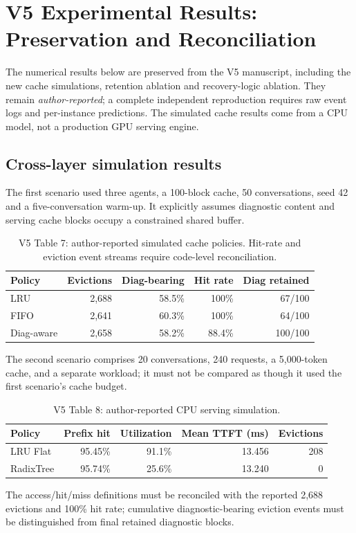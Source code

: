 \section{V5 Experimental Results: Preservation and Reconciliation}
\label{sec:v5_exp_preserve}
The numerical results below are preserved from the V5 manuscript, including
the new cache simulations, retention ablation and recovery-logic ablation.
They remain \emph{author-reported}; a complete independent reproduction
requires raw event logs and per-instance predictions. The simulated cache
results come from a CPU model, not a production GPU serving engine.

\subsection{Cross-layer simulation results}
The first scenario used three agents, a 100-block cache, 50 conversations,
seed 42 and a five-conversation warm-up. It explicitly assumes diagnostic
content and serving cache blocks occupy a constrained shared buffer.
\begin{table}[ht]\centering\footnotesize
\caption{V5 Table 7: author-reported simulated cache policies. Hit-rate
and eviction event streams require code-level reconciliation.}
\label{tab:v5sim1}
\begin{tabular}{lrrrr}\toprule
Policy & Evictions & Diag-bearing & Hit rate & Diag retained\\\midrule
LRU & 2,688 & 58.5\% & 100\% & 67/100\\
FIFO & 2,641 & 60.3\% & 100\% & 64/100\\
Diag-aware & 2,658 & 58.2\% & 88.4\% & 100/100\\
\bottomrule\end{tabular}\end{table}
The second scenario comprises 20 conversations, 240 requests, a
5,000-token cache, and a separate workload; it must not be compared as
though it used the first scenario's cache budget.
\begin{table}[ht]\centering\footnotesize
\caption{V5 Table 8: author-reported CPU serving simulation.}
\label{tab:v5sim2}
\begin{tabular}{lrrrr}\toprule
Policy & Prefix hit & Utilization & Mean TTFT (ms) & Evictions\\\midrule
LRU Flat & 95.45\% & 91.1\% & 13.456 & 208\\
RadixTree & 95.74\% & 25.6\% & 13.240 & 0\\
\bottomrule\end{tabular}\end{table}
The access/hit/miss definitions must be reconciled with the reported 2,688
evictions and 100\% hit rate; cumulative diagnostic-bearing eviction
events must be distinguished from final retained diagnostic blocks.

